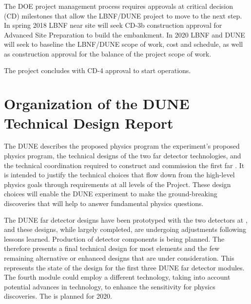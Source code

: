 The DOE project management process requires approvals at critical decision (CD) milestones that allow the LBNF/DUNE project to move to the next step. In spring 2018 LBNF near site  will seek CD-3b construction approval for Advanced Site Preparation to build the embankment. In 2020 LBNF and DUNE will seek to baseline the LBNF/DUNE scope of work, cost and schedule, as well as construction approval for the balance of the project scope of work. 

The project concludes with CD-4 approval to start operations.


\section{Organization of the DUNE Technical Design Report}


The DUNE  describes the proposed physics program  the experiment's proposed physics program, the 
technical designs of the two far detector  technologies, and the technical coordination required to construct and commission the first far .
It is intended to 
justify the technical choices that flow down from the high-level physics goals through requirements at all levels of the Project. These design choices will enable the DUNE experiment to make the ground-breaking discoveries that will help to  answer %
fundamental physics questions. 

The DUNE far detector designs have been prototyped with the two  detectors at , and these designs, while largely completed, are undergoing adjustments following lessons learned. Production of detector components is being planned. 
The   therefore presents a final technical design for most elements and the few remaining alternative or enhanced designs that are under consideration. This  represents the state of the design for the first three DUNE far detector modules.
The fourth module could employ a different \lartpc technology, taking into account  potential advances in technology, to enhance the sensitivity for physics discoveries.  The   is planned for 2020.

